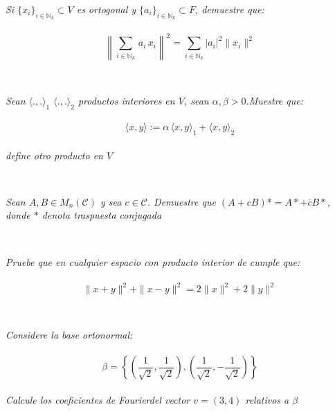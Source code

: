 \documentclass[11pt,letterpaper]{article}
\newcommand{\C}{\mathcal{C}}
\newcommand{\N}{\mathbb{N}}
\begin{document}
\begin{tcolorbox}[
	title = \textcolor{black}{\textcolor{white}{Problema 4}},]
\textit{Si $\{x_i\}_{i\in\N_k}\subset V$ es ortogonal y $\{a_i\}_{i\in \N_k}\subset F$, demuestre que:\,\\
\,\\
\begin{equation*}
	\left\|\sum_{i\in\N_k}\,a_i\,x_i\right\|^2=\sum_{i\in \N_k}|a_i|^2\|x_i\|^2
\end{equation*} 
}
\end{tcolorbox}\,\\
\begin{tcolorbox}[
	title = \textcolor{black}{\textcolor{white}{Problema 5 (convexidad de productos interiores)}},]
\textit{Sean $\langle.,. \rangle_1$ $\langle.,. \rangle_2$ productos interiores en $V$, sean $\alpha,\beta>0$.Muestre que:\,\\
\,\\
\begin{equation*}
	\langle x,y\rangle:=\alpha\,\langle x,y \rangle_1+\langle x,y \rangle_2
\end{equation*}\,\\
define otro producto en $V$
}
\end{tcolorbox}\,\\
\begin{tcolorbox}[
	title = \textcolor{black}{\textcolor{white}{Problema 6}},]
\textit{Sean $A,B \in M_{n}(\C)$ y sea $c\in \C$. Demuestre que $(A+cB)*=A*+\overline{c}B*$, donde $*$ denota traspuesta conjugada 
}
\end{tcolorbox}\,\\
\begin{tcolorbox}[
	title = \textcolor{black}{\textcolor{white}{Problema 7}},]
\textit{Pruebe que en cualquier espacio con producto interior de cumple que:\,\\
\,\\
\begin{equation*}
	\|x+y\|^2+\|x-y\|^2=2\|x\|^2+2\|y\|^2
\end{equation*}
}
\end{tcolorbox}\,\\
\begin{tcolorbox}[
	title = \textcolor{black}{\textcolor{white}{Problema 8}},]
\textit{Considere la base ortonormal:\,\\
\,\\
\begin{equation*}
	\beta=\left\{\left(\frac{1}{\sqrt{2}},\frac{1}{\sqrt{2}}\right),\left(\frac{1}{\sqrt{2}},-\frac{1}{\sqrt{2}}\right)\right\}
\end{equation*}\,\\
Calcule los coeficientes de Fourierdel vector $v=(3,4)$ relativos a $\beta$
}
\end{tcolorbox}\,\\
\end{document}
